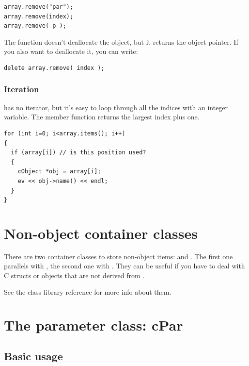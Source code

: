 \begin{verbatim}
array.remove("par");
array.remove(index);
array.remove( p );
\end{verbatim}


The  function doesn't deallocate the object, but it
returns the object pointer. If you also want to deallocate it, you can
write:

\begin{verbatim}
delete array.remove( index );
\end{verbatim}

\subsubsection{Iteration}


 has no iterator, but it's easy to loop through all the
indices with an integer variable. The  member function
returns the largest index plus one.

\begin{verbatim}
for (int i=0; i<array.items(); i++)
{
  if (array[i]) // is this position used?
  {
    cObject *obj = array[i];
    ev << obj->name() << endl;
  }
}
\end{verbatim}




\section{Non-object container classes}

There are two container classes to store non-object
items:  and
.  The first one parallels with , the
second one with . They can be useful if you have to
deal with C structs or objects that are not derived from
.

See the class library reference for more info about them.





\section{The parameter class: cPar}

\subsection{Basic usage}

